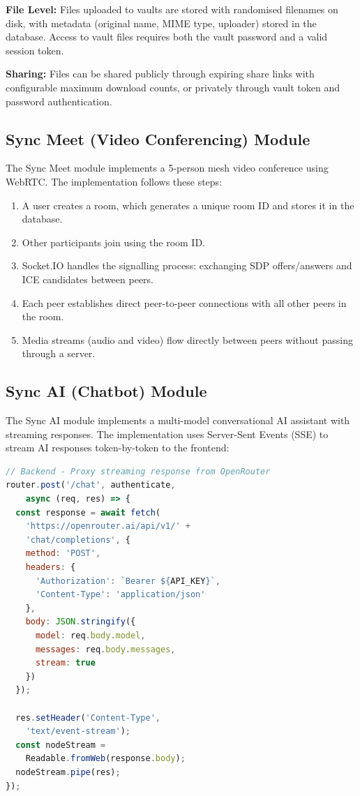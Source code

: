 \documentclass[12pt,a4paper]{report}
\begin{document}
\textbf{File Level:} Files uploaded to vaults are stored with randomised filenames on disk, with metadata (original name, MIME type, uploader) stored in the database. Access to vault files requires both the vault password and a valid session token.

\textbf{Sharing:} Files can be shared publicly through expiring share links with configurable maximum download counts, or privately through vault token and password authentication.

\subsection{Sync Meet (Video Conferencing) Module}

The Sync Meet module implements a 5-person mesh video conference using WebRTC. The implementation follows these steps:

\begin{enumerate}
    \item A user creates a room, which generates a unique room ID and stores it in the database.
    \item Other participants join using the room ID.
    \item Socket.IO handles the signalling process: exchanging SDP offers/answers and ICE candidates between peers.
    \item Each peer establishes direct peer-to-peer connections with all other peers in the room.
    \item Media streams (audio and video) flow directly between peers without passing through a server.
\end{enumerate}

\subsection{Sync AI (Chatbot) Module}

The Sync AI module implements a multi-model conversational AI assistant with streaming responses. The implementation uses Server-Sent Events (SSE) to stream AI responses token-by-token to the frontend:

\begin{lstlisting}[language=JavaScript, caption={Streaming Chat Response}]
// Backend - Proxy streaming response from OpenRouter
router.post('/chat', authenticate,
    async (req, res) => {
  const response = await fetch(
    'https://openrouter.ai/api/v1/' +
    'chat/completions', {
    method: 'POST',
    headers: {
      'Authorization': `Bearer ${API_KEY}`,
      'Content-Type': 'application/json'
    },
    body: JSON.stringify({
      model: req.body.model,
      messages: req.body.messages,
      stream: true
    })
  });

  res.setHeader('Content-Type',
    'text/event-stream');
  const nodeStream =
    Readable.fromWeb(response.body);
  nodeStream.pipe(res);
});
\end{lstlisting}
\end{document}
